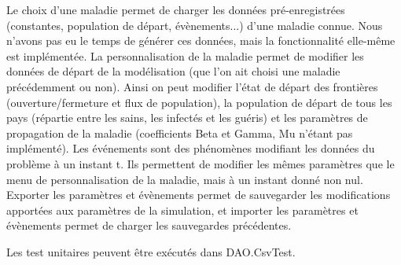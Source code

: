 \documentclass[12pt,a4paper]{report}
\begin{document}
\begin{flushleft}
Le choix d'une maladie permet de charger les données pré-enregistrées (constantes, population de départ, évènements...) d'une maladie connue. Nous n'avons pas eu le temps de générer ces données, mais la fonctionnalité elle-même est implémentée.
La personnalisation de la maladie permet de modifier les données de départ de la modélisation (que l'on ait choisi une maladie précédemment ou non). Ainsi on peut modifier l'état de départ des frontières (ouverture/fermeture et flux de population), la 
population de départ de tous les pays (répartie entre les sains, les infectés et les guéris) et les paramètres de propagation de la maladie (coefficients Beta et Gamma, Mu n'étant pas implémenté).
Les événements sont des phénomènes modifiant les données du problème à un instant t. Ils permettent de modifier les mêmes paramètres que le menu de personnalisation de la maladie, mais à un instant donné non nul. 
Exporter les paramètres et évènements permet de sauvegarder les modifications apportées aux paramètres de la simulation, et importer les paramètres et évènements permet de charger les sauvegardes précédentes.
\end{flushleft}

\begin{flushleft}
	Les test unitaires peuvent être exécutés dans DAO.CsvTest.
\end{flushleft}
\end{document}
